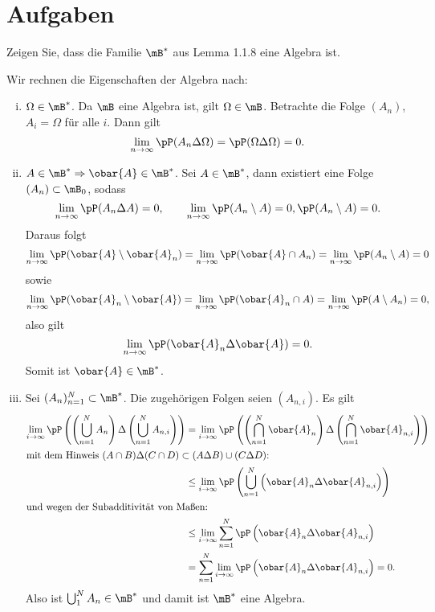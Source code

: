 \section{Aufgaben}
\begin{aufg}
  Zeigen Sie, dass die Familie $\mB^*$ aus Lemma 1.1.8 eine Algebra ist.
\end{aufg}

Wir rechnen die Eigenschaften der Algebra nach:
\begin{enumerate}[(i)]
\item $\Omega \in \mB^*$. Da $\mB$ eine Algebra ist, gilt $\Omega \in \mB$.
  Betrachte die Folge $(A_n)$, $A_i = \Omega$ für alle $i$. Dann gilt
  \[ \lim_{n \to \infty} \pP( A_n \Delta \Omega ) = \pP( \Omega \Delta \Omega)
    = 0.\]
\item $A \in \mB^* \Rightarrow \obar{A} \in \mB^*$. Sei $A \in \mB^*$, dann
  existiert eine Folge $(A_n) \subset \mB_0$, sodass
  \[ \lim_{n \to \infty} \pP( A_n \Delta A ) = 0, \qquad \lim_{n \to \infty}
    \pP( A_n \setminus A ) =  0, \pP( A_n \setminus A ) =  0. \]
  Daraus folgt
  \[ \lim_{n \to \infty} \pP( \obar{A} \setminus \obar{A}_n ) =
    \lim_{n \to \infty} \pP( \obar{A} \cap A_n ) =
    \lim_{n \to \infty} \pP( A_n \setminus A ) = 0 \]
  sowie
  \[ \lim_{n \to \infty} \pP( \obar{A}_n \setminus \obar{A} ) =
    \lim_{n \to \infty} \pP( \obar{A}_n \cap A ) =
    \lim_{n \to \infty} \pP( A \setminus A_n ) = 0, \]
  also gilt
  \[ \lim_{n \to \infty} \pP( \obar{A}_n \Delta \obar{A} ) = 0. \]
  Somit ist $\obar{A} \in \mB^*$.
\item Sei $(A_n)_{n=1}^N \subset \mB^*$. Die zugehörigen Folgen seien
  $(A_{n,i})$. Es gilt
  \begin{align*}
    \lim_{i \to \infty} \pP \left(
      \left( \bigcup_{n=1}^N A_n \right) \Delta
      \left( \bigcup_{n=1}^N A_{n,i} \right)
    \right)
    &=
    \lim_{i \to \infty} \pP \left(
      \left( \bigcap_{n=1}^N \obar{A}_n \right) \Delta
      \left( \bigcap_{n=1}^N \obar{A}_{n,i} \right)
      \right) \\
    \intertext{mit dem Hinweis $(A \cap B) \Delta (C \cap D) \subset (A \Delta B) \cup (C \Delta D)$:}
    &\le
    \lim_{i \to \infty} \pP \left( \bigcup_{n=1}^N
      \left( \obar{A}_n \Delta
      \obar{A}_{n,i} \right)
      \right) \\
    \intertext{und wegen der Subadditivität von Maßen:}
    &\le
    \lim_{i \to \infty} \sum_{n=1}^N \pP \left(
      \obar{A}_n \Delta
      \obar{A}_{n,i}
      \right) \\
    &=
     \sum_{n=1}^N \lim_{i \to \infty} \pP \left(
      \obar{A}_n \Delta
      \obar{A}_{n,i}
      \right) = 0.
  \end{align*}
  Also ist $\bigcup_1^N A_n \in \mB^*$ und damit ist $\mB^*$ eine Algebra.
\end{enumerate}

